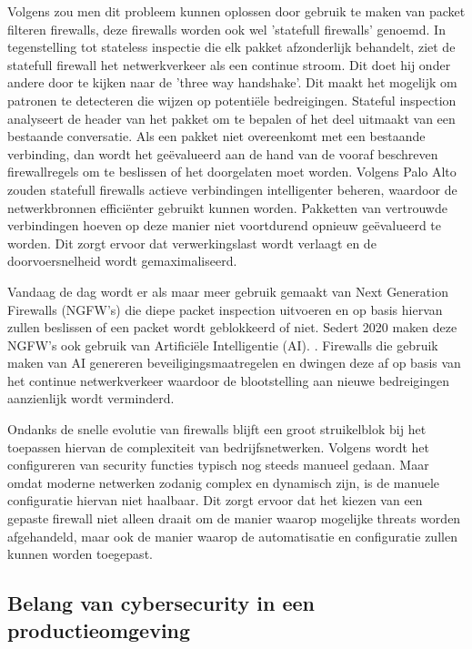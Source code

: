 Volgens \textcite{paloAltoSF2025} zou men dit probleem kunnen oplossen door gebruik te maken van packet filteren firewalls, deze firewalls worden ook wel 'statefull firewalls' genoemd. In tegenstelling tot stateless inspectie die elk pakket afzonderlijk behandelt, ziet de statefull firewall het netwerkverkeer als een continue stroom. Dit doet hij onder andere door te kijken naar de 'three way handshake'. Dit maakt het mogelijk om patronen te detecteren die wijzen op potentiële bedreigingen. Stateful inspection analyseert de header van het pakket om te bepalen of het deel uitmaakt van een bestaande conversatie. Als een pakket niet overeenkomt met een bestaande verbinding, dan wordt het geëvalueerd aan de hand van de vooraf beschreven firewallregels om te beslissen of het doorgelaten moet worden. Volgens Palo Alto zouden statefull firewalls actieve verbindingen intelligenter beheren, waardoor de netwerkbronnen efficiënter gebruikt kunnen worden. Pakketten van vertrouwde verbindingen hoeven op deze manier niet voortdurend opnieuw geëvalueerd te worden. Dit zorgt ervoor dat verwerkingslast wordt verlaagt en de doorvoersnelheid wordt gemaximaliseerd. 

Vandaag de dag wordt er als maar meer gebruik gemaakt van Next Generation Firewalls (NGFW’s) die diepe packet inspection uitvoeren en op basis hiervan zullen beslissen of een packet wordt geblokkeerd of niet. Sedert 2020 maken deze NGFW’s ook gebruik van Artificiële Intelligentie (AI). \autocite{Ahmadi2023}. Firewalls die gebruik maken van AI genereren beveiligingsmaatregelen en dwingen deze af op basis van het continue netwerkverkeer waardoor de blootstelling aan nieuwe bedreigingen aanzienlijk wordt verminderd. \autocite{PaloAltoFW2024}

Ondanks de snelle evolutie van firewalls blijft een groot struikelblok bij het toepassen hiervan de complexiteit van bedrijfsnetwerken. Volgens \textcite{Bringhenti2023} wordt het configureren van security functies typisch nog steeds manueel gedaan. Maar omdat moderne netwerken zodanig complex en dynamisch zijn, is de manuele configuratie hiervan niet haalbaar. Dit zorgt ervoor dat het kiezen van een gepaste firewall niet alleen draait om de manier waarop mogelijke threats worden afgehandeld, maar ook de manier waarop de automatisatie en configuratie zullen kunnen worden toegepast.

  
\subsection{Belang van cybersecurity in een productieomgeving}

